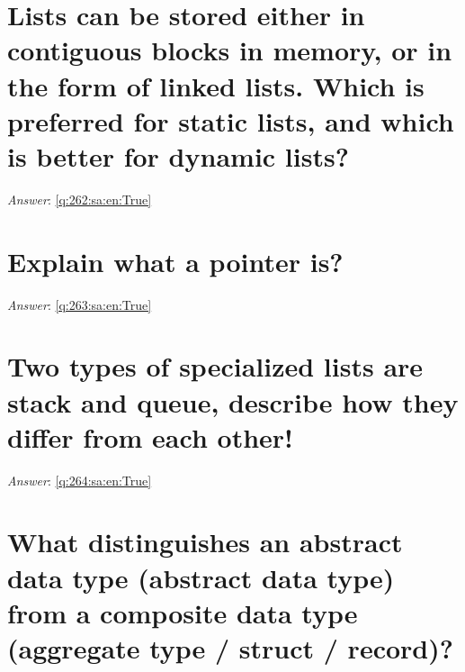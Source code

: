\documentclass[a4paper,11pt,oneside]{book}
\begin{document}
\begin{sloppypar}
\section{Lists can be stored either in contiguous blocks in memory, or in the form of linked lists. Which is preferred for static lists, and which is better for dynamic lists?}

\label{q:262:sa:en:False}

\vspace{2cm}

\noindent\makebox[\textwidth]{\hrulefill}

\vspace{1cm}

\textit{Answer}: \autoref{q:262:sa:en:True}



\section{Explain what a pointer is?}

\label{q:263:sa:en:False}

\vspace{2cm}

\noindent\makebox[\textwidth]{\hrulefill}

\vspace{1cm}

\textit{Answer}: \autoref{q:263:sa:en:True}



\section{Two types of specialized lists are stack and queue, describe how they differ from each other!}

\label{q:264:sa:en:False}

\vspace{2cm}

\noindent\makebox[\textwidth]{\hrulefill}

\vspace{1cm}

\textit{Answer}: \autoref{q:264:sa:en:True}



\section{What distinguishes an abstract data type (abstract data type) from a composite data type (aggregate type / struct / record)?}


\end{sloppypar}
\end{document}
